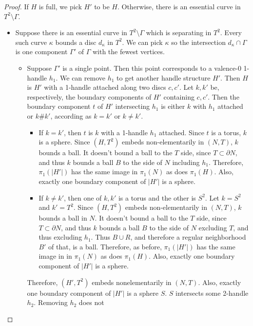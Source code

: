 \documentclass{article}
\theoremstyle{plain}
\theoremstyle{plain}
\theoremstyle{definition}
\numberwithin{equation}{section}
\begin{document}
\begin{proof}
If $H$ is full, we pick $H'$ to be $H$. Otherwise,
there is an essential curve in $T^2 \setminus \Gamma$.
\begin{itemize}
\item 
	Suppose there is an essential curve in $T^2 \setminus \Gamma$
	which is separating in $T^2$. Every such curve $\kappa$
	bounds a disc $d_\kappa$ in $T^2$. We can pick $\kappa$ so
	the intersection $d_\kappa \cap \Gamma$ is one component $\Gamma'$ of $\Gamma$
	with the fewest vertices.
	\begin{itemize}
	\item 
		Suppose $\Gamma'$ is a single point. Then this point
		corresponds to a valence-0 1-handle $h_1$.
		We can remove $h_1$ to get another
		handle structure $H'$. Then $H$ is $H'$ with a 1-handle
		attached along two discs $c,c'$. Let $k, k'$ be, respectively,
		the boundary components of $H'$ containing $c,c'$. Then
		the boundary component $t$ of $H'$ intersecting $h_1$ is
		either $k$ with $h_1$ attached or $k \# k'$, according
		as $k = k'$ or $k \neq k'$.
		\begin{itemize}
		\item
			If $k = k'$, then $t$ is $k$ with a 1-handle $h_1$
			attached. Since $t$ is a torus, $k$ is a sphere.
			Since $(H, T^2)$ embeds
			non-elementarily in $(N,T)$, $k$ bounds a ball.
			It doesn't bound a ball to the $T$ side, since
			$T \subset \partial N$, and thus $k$ bounds
			a ball $B$ to the side of $N$ including $h_1$.
			Therefore, $\pi_1(|H'|)$ has the same image
			in $\pi_1(N)$ as does $\pi_1(H)$.
			Also, exactly one boundary component of $|H'|$
			is a sphere.
		\item
			If $k \neq k'$, then one of $k,k'$ is a torus
			and the other is $S^2$. Let $k = S^2$ and
			$k' = T^2$. Since $(H, T^2)$
			embeds non-elementarily in $(N,T)$, $k$ bounds a ball in $N$.
			It doesn't bound a ball to the $T$ side, since
			$T \subset \partial N$, and thus $k$ bounds
			a ball $B$ to the side of $N$ excluding $T$,
			and thus excluding $h_1$. Thus $B \cup R$,
			and therefore a regular neighborhood $B'$ of that,
			is a ball. Therefore, as before, 
			$\pi_1(|H'|)$ has the same image in 
			in $\pi_1(N)$ as does $\pi_1(H)$.
			Also, exactly one boundary component of $|H'|$
			is a sphere.
		\end{itemize}
		Therefore, $(H',T^2)$ embeds nonelementarily in $(N,T)$.
		Also, exactly one boundary component of $|H'|$ is a sphere $S$.
		$S$ intersects some 2-handle $h_2$. Removing $h_2$ does not

\end{itemize}
\end{itemize}
\end{proof}
\end{document}

